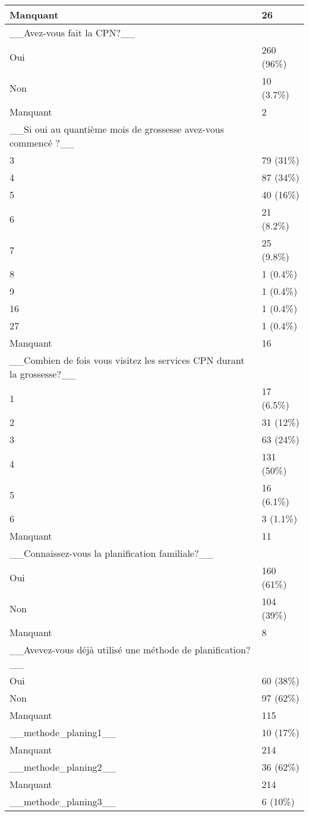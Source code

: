 \documentclass[
]{book}
\begin{document}
\begin{tabular}{l|l}
\hline
Manquant & 26\\
\hline
\_\_Avez-vous fait la CPN?\_\_ & \\
\hline
Oui & 260 (96\%)\\
\hline
Non & 10 (3.7\%)\\
\hline
Manquant & 2\\
\hline
\_\_Si oui au quantième mois de grossesse avez-vous commencé ?\_\_ & \\
\hline
3 & 79 (31\%)\\
\hline
4 & 87 (34\%)\\
\hline
5 & 40 (16\%)\\
\hline
6 & 21 (8.2\%)\\
\hline
7 & 25 (9.8\%)\\
\hline
8 & 1 (0.4\%)\\
\hline
9 & 1 (0.4\%)\\
\hline
16 & 1 (0.4\%)\\
\hline
27 & 1 (0.4\%)\\
\hline
Manquant & 16\\
\hline
\_\_Combien de fois vous visitez les services CPN durant la grossesse?\_\_ & \\
\hline
1 & 17 (6.5\%)\\
\hline
2 & 31 (12\%)\\
\hline
3 & 63 (24\%)\\
\hline
4 & 131 (50\%)\\
\hline
5 & 16 (6.1\%)\\
\hline
6 & 3 (1.1\%)\\
\hline
Manquant & 11\\
\hline
\_\_Connaissez-vous la planification familiale?\_\_ & \\
\hline
Oui & 160 (61\%)\\
\hline
Non & 104 (39\%)\\
\hline
Manquant & 8\\
\hline
\_\_Avevez-vous déjà utilisé une méthode de planification?\_\_ & \\
\hline
Oui & 60 (38\%)\\
\hline
Non & 97 (62\%)\\
\hline
Manquant & 115\\
\hline
\_\_methode\_planing1\_\_ & 10 (17\%)\\
\hline
Manquant & 214\\
\hline
\_\_methode\_planing2\_\_ & 36 (62\%)\\
\hline
Manquant & 214\\
\hline
\_\_methode\_planing3\_\_ & 6 (10\%)\\

\end{tabular}
\end{document}
